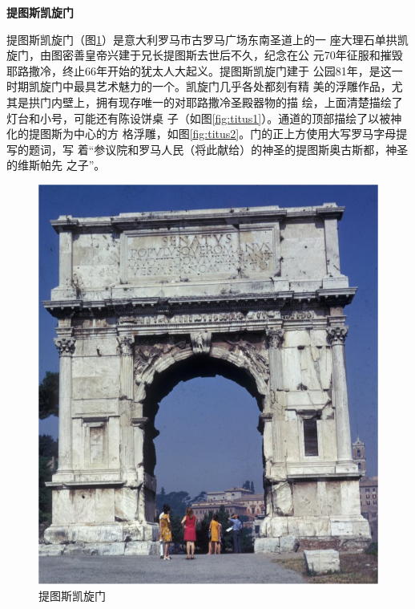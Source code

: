 \documentclass[a4paper,dvipdfm]{article}
\begin{document}
\textbf{提图斯凯旋门}

提图斯凯旋门（图\ref{fig:titus}）是意大利罗马市古罗马广场东南圣道上的一
座大理石单拱凯旋门，由图密善皇帝兴建于兄长提图斯去世后不久，纪念在公
元70年征服和摧毁耶路撒冷，终止66年开始的犹太人大起义。提图斯凯旋门建于
公园81年，是这一时期凯旋门中最具艺术魅力的一个。凯旋门几乎各处都刻有精
美的浮雕作品，尤其是拱门内壁上，拥有现存唯一的对耶路撒冷圣殿器物的描
绘，上面清楚描绘了灯台和小号，可能还有陈设饼桌
子（如图\ref{fig:titus1}）。通道的顶部描绘了以被神化的提图斯为中心的方
格浮雕，如图\ref{fig:titus2}。门的正上方使用大写罗马字母提写的题词，写
着``参议院和罗马人民（将此献给）的神圣的提图斯奥古斯都，神圣的维斯帕先
之子''。

\begin{figure}[hbt!]
  \centering
  \includegraphics[width=\textwidth]{Arc_de_titus_frontal}
  \caption{提图斯凯旋门}
  \label{fig:titus}
\end{figure}
\end{document}
